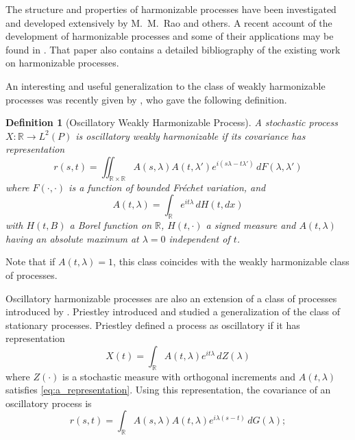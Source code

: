 \documentclass[12pt]{article}
\newtheorem{definition}{Definition}[section]
\begin{document}
The structure and properties of harmonizable processes have been investigated and developed extensively by M.~M.~Rao and others. A recent account of the development of harmonizable processes and some of their applications may be found in \cite{Swift1997b}. That paper also contains a detailed bibliography of the existing work on harmonizable processes.

An interesting and useful generalization to the class of weakly harmonizable processes was recently given by \cite{Swift1997a}, who gave the following definition.

\begin{definition}[Oscillatory Weakly Harmonizable Process]\label{def:osc_weak_harm}
A stochastic process $X: \mathbb{R} \to L^2(P)$ is \emph{oscillatory weakly harmonizable} if its covariance has representation
\begin{equation}
    r(s, t) = \iint_{\mathbb{R} \times \mathbb{R}} A(s, \lambda)A(t, \lambda') e^{i(s\lambda-t\lambda')} \, dF(\lambda, \lambda')
    \label{eq:osc_harm_cov}
\end{equation}
where $F(\cdot,\cdot)$ is a function of bounded Fréchet variation, and
\begin{equation}
    A(t, \lambda) = \int_{\mathbb{R}} e^{it\lambda} \, dH(t, dx)
    \label{eq:a_representation}
\end{equation}
with $H(t, B)$ a Borel function on $\mathbb{R}$, $H(t,\cdot)$ a signed measure and $A(t, \lambda)$ having an absolute maximum at $\lambda = 0$ independent of $t$.
\end{definition}

Note that if $A(t, \lambda) = 1$, this class coincides with the weakly harmonizable class of processes.

Oscillatory harmonizable processes are also an extension of a class of processes introduced by \cite{Priestley1965}. Priestley introduced and studied a generalization of the class of stationary processes. Priestley defined a process as oscillatory if it has representation
\begin{equation}
    X(t) = \int_{\mathbb{R}} A(t, \lambda) e^{it\lambda} \, dZ(\lambda)
    \label{eq:priestley_rep}
\end{equation}
where $Z(\cdot)$ is a stochastic measure with orthogonal increments and $A(t, \lambda)$ satisfies \eqref{eq:a_representation}. Using this representation, the covariance of an oscillatory process is
\begin{equation}
    r(s, t) = \int_{\mathbb{R}} A(s, \lambda) A(t, \lambda) e^{i\lambda(s-t)} \, dG(\lambda);
    \label{eq:osc_cov}
\end{equation}
\end{document}
